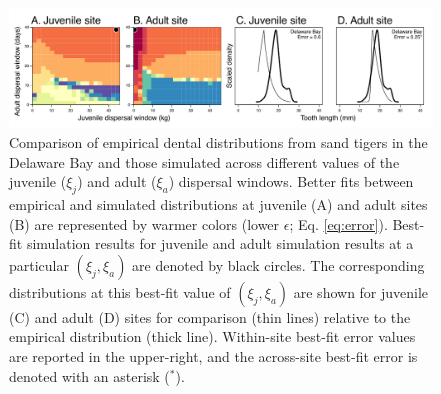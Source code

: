 \documentclass[]{rsos}%
\begin{document}
\begin{figure}
  \centering
  \includegraphics[width=1\linewidth]{fig_empirical_comp_Delaware2.pdf}  
\caption{Comparison of empirical dental distributions from sand tigers in the Delaware Bay and those simulated across different values of the juvenile ($\xi_j$) and adult ($\xi_a$) dispersal windows.
Better fits between empirical and simulated distributions at juvenile (A) and adult sites (B) are represented by warmer colors (lower $\epsilon$; Eq. \ref{eq:error}). 
Best-fit simulation results for juvenile and adult simulation results at a particular $(\xi_j,\xi_a)$ are denoted by black circles.
The corresponding distributions at this best-fit value of $(\xi_j,\xi_a)$ are shown for juvenile (C) and adult (D) sites for comparison (thin lines) relative to the empirical distribution (thick line). 
Within-site best-fit error values are reported in the upper-right, and the across-site best-fit error is denoted with an asterisk (${}^\ast$).}
\label{fig:compmodern}
\end{figure}
\end{document}
